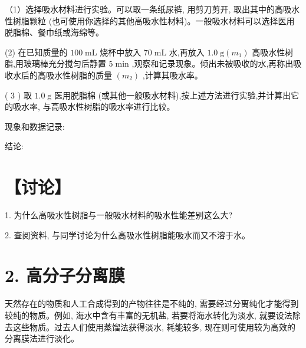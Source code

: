 \documentclass[10pt]{article}
\begin{document}
（1）选择吸水材料进行实验。可以取一条纸尿裤, 用剪刀剪开, 取出其中的高吸水性树脂颗粒 (也可使用你选择的其他高吸水性材料)。一般吸水材料可以选择医用脱脂棉、餐巾纸或海绵等。

(2) 在已知质量的 \({100}\mathrm{\;{mL}}\) 烧杯中放入 \({70}\mathrm{\;{mL}}\) 水,再放入 \({1.0}\mathrm{\;g}\left( {m}_{1}\right)\) 高吸水性树脂,用玻璃棒充分搅匀后静置 \(5\mathrm{\;{min}}\) ,观察和记录现象。倾出未被吸收的水,再称出吸收水后的高吸水性树脂的质量 \(\left( {m}_{2}\right)\) ,计算其吸水率。

( 3 ) 取 \({1.0}\mathrm{\;g}\) 医用脱脂棉 (或其他一般吸水材料),按上述方法进行实验,并计算出它的吸水率, 与高吸水性树脂的吸水率进行比较。

现象和数据记录:

\begin{center}
\end{center}

结论:

\section*{【讨论】}

1. 为什么高吸水性树脂与一般吸水材料的吸水性能差别这么大?

2. 查阅资料, 与同学讨论为什么高吸水性树脂能吸水而又不溶于水。

\section*{2. 高分子分离膜}

天然存在的物质和人工合成得到的产物往往是不纯的, 需要经过分离纯化才能得到较纯的物质。例如, 海水中含有丰富的无机盐, 若要将海水转化为淡水, 就要设法除去这些物质。过去人们使用蒸馏法获得淡水, 耗能较多, 现在则可使用较为高效的分离膜法进行淡化。
\end{document}
